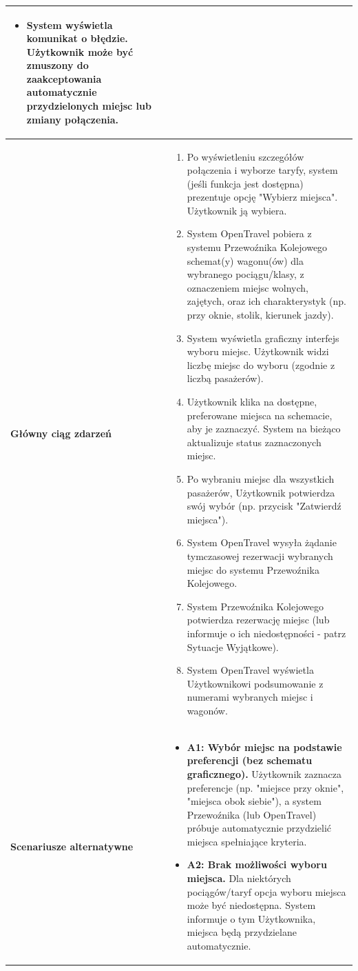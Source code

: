 \documentclass[a4paper,12pt]{article}
\begin{document}
\begin{longtable}{|p{\pierwszakolumnaszerokoscPUBKWybormiejsca}|p{\drugakolumnaszerokoscPUBKWybormiejsca}|}
\begin{itemize}
            \item System wyświetla komunikat o błędzie. Użytkownik może być zmuszony do zaakceptowania automatycznie przydzielonych miejsc lub zmiany połączenia.
        \end{itemize} \\
    \hline
    \textbf{Główny ciąg zdarzeń} &
        \begin{enumerate} \itemsep0pt \parskip0pt \parsep0pt
            \item Po wyświetleniu szczegółów połączenia i wyborze taryfy, system (jeśli funkcja jest dostępna) prezentuje opcję "Wybierz miejsca". Użytkownik ją wybiera.
            \item System OpenTravel pobiera z systemu Przewoźnika Kolejowego schemat(y) wagonu(ów) dla wybranego pociągu/klasy, z oznaczeniem miejsc wolnych, zajętych, oraz ich charakterystyk (np. przy oknie, stolik, kierunek jazdy).
            \item System wyświetla graficzny interfejs wyboru miejsc. Użytkownik widzi liczbę miejsc do wyboru (zgodnie z liczbą pasażerów).
            \item Użytkownik klika na dostępne, preferowane miejsca na schemacie, aby je zaznaczyć. System na bieżąco aktualizuje status zaznaczonych miejsc.
            \item Po wybraniu miejsc dla wszystkich pasażerów, Użytkownik potwierdza swój wybór (np. przycisk "Zatwierdź miejsca").
            \item System OpenTravel wysyła żądanie tymczasowej rezerwacji wybranych miejsc do systemu Przewoźnika Kolejowego.
            \item System Przewoźnika Kolejowego potwierdza rezerwację miejsc (lub informuje o ich niedostępności - patrz Sytuacje Wyjątkowe).
            \item System OpenTravel wyświetla Użytkownikowi podsumowanie z numerami wybranych miejsc i wagonów.
        \end{enumerate} \\
    \hline
    \textbf{Scenariusze alternatywne} &
        \begin{itemize} \itemsep0pt \parskip0pt \parsep0pt
            \item \textbf{A1: Wybór miejsc na podstawie preferencji (bez schematu graficznego).} Użytkownik zaznacza preferencje (np. "miejsce przy oknie", "miejsca obok siebie"), a system Przewoźnika (lub OpenTravel) próbuje automatycznie przydzielić miejsca spełniające kryteria.
            \item \textbf{A2: Brak możliwości wyboru miejsca.} Dla niektórych pociągów/taryf opcja wyboru miejsca może być niedostępna. System informuje o tym Użytkownika, miejsca będą przydzielane automatycznie.

\end{itemize}
\end{longtable}
\end{document}
